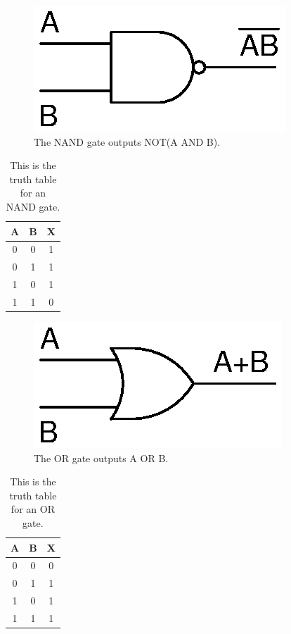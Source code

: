 \begin{figure}[!htb]
	\centering
	\includegraphics[scale=0.7]{logic/NAND.eps}
	\caption{The NAND gate outputs NOT(A AND B).}
	\label{fig:nandgate}
\end{figure} 

\begin{table}[!ht]
	\centering
	\begin{tabular}{| c | c | c |}
		\hline
		A & B & X \\ 
		\hline
		0 & 0 & 1 \\ \hline
		0 & 1 & 1 \\ \hline
		1 & 0 & 1 \\ \hline
		1 & 1 & 0 \\ \hline
	\end{tabular}
	\caption{This is the truth table for an NAND gate.}
	\label{table:nandgate}
\end{table}

\begin{figure}[!htb]
	\centering
	\includegraphics[scale=0.7]{logic/OR.eps}
	\caption{The OR gate outputs A OR B.}
	\label{fig:orgate}
\end{figure} 

\begin{table}[!ht]
	\centering
	\begin{tabular}{| c | c | c |}
		\hline
		A & B & X \\ 
		\hline
		0 & 0 & 0 \\ \hline
		0 & 1 & 1 \\ \hline
		1 & 0 & 1 \\ \hline
		1 & 1 & 1 \\ \hline
	\end{tabular}
	\caption{This is the truth table for an OR gate.}
	\label{table:orgate}
\end{table}

